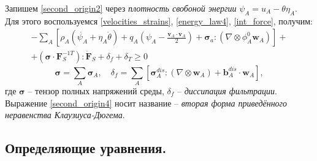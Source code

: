 	Запишем \eqref{second_origin2} через \textit{плотность свобоной энергии} $\psi_A = u_A - \theta \eta_A$. Для этого воспользуемся \eqref{velocities_strains}, \eqref{energy_law4}, \eqref{int_force}, получим:
\begin{multline}
	\label{second_origin3}
	-\sum\limits_{A} \left[\rho_A \left(\dot{\psi_A} + \eta_A\dot{\theta}\right) + q_A\left(\psi_A - \frac{\boldsymbol{v}_A\cdot \boldsymbol{v}_A}{2}\right) + \boldsymbol{\sigma}_a :\left(\nabla \otimes \phi_A^0 \boldsymbol{w}_A\right)\right]+\\
	+\left(\boldsymbol{\sigma} \cdot \boldsymbol{F}_S^{-1T}\right) : \dot{\boldsymbol{F}}_S + \delta_f + \delta_T \geq 0
\end{multline}
\begin{equation}
	\label{second_origin4}
	\boldsymbol{\sigma} = \sum_A \boldsymbol{\sigma}_A, 
	\quad \delta_f = \sum_A\left[\boldsymbol{\sigma}_A^{dis}:\left(\nabla \otimes \boldsymbol{w}_A\right)+\boldsymbol{b}_A^{dis} \cdot \boldsymbol{w}_A\right],
\end{equation}
	где $\boldsymbol{\sigma}$ -- тензор полных напряжений среды,
	$\delta_f$ -- \textit{диссипация фильтрации}.
	Выражение \eqref{second_origin4} носит название -- \textit{вторая форма приведённого неравенства Клаузиуса-Дюгема}.
	
\subsection{Определяющие уравнения.}

	 